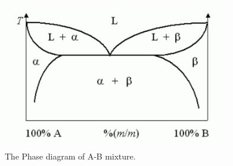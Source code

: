 \begin{figure}[ht]
\centering
\includegraphics[width=10cm]{imgs/Eutectic.pdf}
\caption{The Phase diagram of A-B mixture.}
\end{figure}


